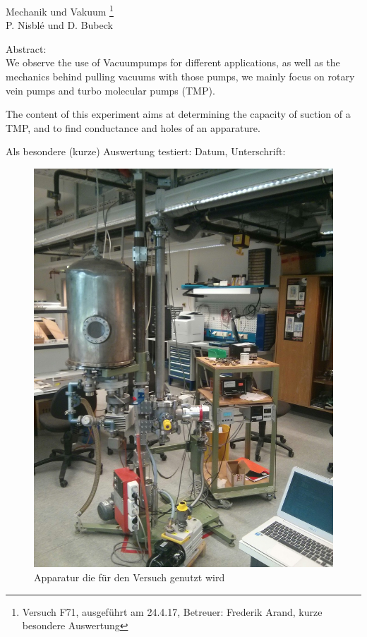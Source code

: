 \documentclass[12pt, a4paper]{scrartcl}
\begin{document}
	
	\thispagestyle{empty}
	\null\vspace{40mm}
	\begin{center}
		{
			\Large Mechanik und Vakuum
			\footnote{
				\noindent Versuch F71, ausgeführt am 24.4.17,
				Betreuer: Frederik Arand,
				kurze besondere Auswertung
			}
		}\\[15mm]
		P. Nisblé und D. Bubeck
		
		\vspace{25mm}
		
		\parbox{0.9\textwidth}{
			Abstract:\\    
			\small We observe the use of Vacuumpumps for different applications, as well as the mechanics behind pulling vacuums with those pumps, we mainly focus on rotary vein pumps and turbo molecular pumps (TMP).
            
            The content of this experiment aims at determining the capacity of suction of a TMP, and to find conductance and holes of an apparature.
		}
	\end{center}
	
	\vfill
	Als besondere (kurze) Auswertung testiert: Datum, Unterschrift:
	\vspace{20mm}
	\newpage  
	\null\thispagestyle{empty} 
	
	\begin{figure}[H]
		\centering
		\includegraphics[height=.6\paperheight]{foto1}
		\caption{Apparatur die für den Versuch genutzt wird}
	\end{figure}
	
\end{document}
